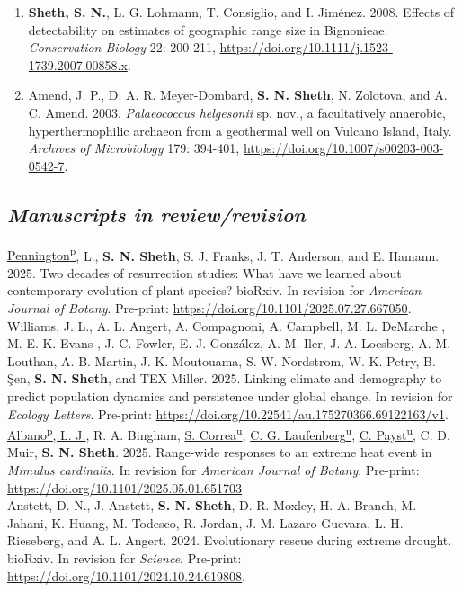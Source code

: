 \documentclass[11pt,english]{article}
\providecommand{\tabularnewline}{\\}
\begin{document}
\begin{hangparas}{.5in}{1}
\begin{enumerate}
\item \textbf{Sheth, S. N.}, L. G. Lohmann, T. Consiglio, and I. Jim\'enez. 2008. Effects of detectability on estimates of geographic range size in Bignonieae. \emph{Conservation Biology} 22: 200-211, \url{https://doi.org/10.1111/j.1523-1739.2007.00858.x}. 

\item Amend, J. P., D. A. R. Meyer-Dombard, \textbf{S. N. Sheth}, N. Zolotova, and A. C. Amend. 2003. \textit{Palaeococcus helgesonii} sp. nov., a facultatively anaerobic, hyperthermophilic archaeon from a geothermal well on Vulcano Island, Italy. \emph{Archives of Microbiology} 179: 394-401, \url{https://doi.org/10.1007/s00203-003-0542-7}. 

\end{enumerate}
\end{hangparas}

\subsection*{\textit{Manuscripts in review/revision}} 

\begin{hangparas}{.5in}{1}

\underline{Pennington\textsuperscript{p}}, L., \textbf{S. N. Sheth}, S. J. Franks, J. T. Anderson, and E. Hamann. 2025. Two decades of resurrection studies: What have we learned about contemporary evolution of plant species? bioRxiv. In revision for \emph{American Journal of Botany}. Pre-print: \url{https://doi.org/10.1101/2025.07.27.667050}. \tabularnewline

Williams, J. L., A. L. Angert, A. Compagnoni, A. Campbell, M. L. DeMarche , M. E. K. Evans , J. C. Fowler, E. J. González, A. M. Iler, J. A. Loesberg, A. M. Louthan, A. B. Martin, J. K. Moutouama, S. W. Nordstrom, W. K. Petry, B. Şen, \textbf{S. N. Sheth}, and TEX Miller. 2025. Linking climate and demography to predict population dynamics and persistence under global change. In revision for \emph{Ecology Letters}. Pre-print: \url{https://doi.org/10.22541/au.175270366.69122163/v1}. \tabularnewline

\underline{Albano\textsuperscript{p}, L. J.}, R. A. Bingham, \underline{S. Correa\textsuperscript{u}}, \underline{C. G. Laufenberg\textsuperscript{u}}, \underline{C. Payst\textsuperscript{u}}, C. D. Muir, \textbf{S. N. Sheth}. 2025. Range-wide responses to an extreme heat event in \emph{Mimulus cardinalis}. In revision for \emph{American Journal of Botany}. Pre-print: \url{https://doi.org/10.1101/2025.05.01.651703} \tabularnewline

Anstett, D. N., J. Anstett, \textbf{S. N. Sheth}, D. R. Moxley, H. A. Branch, M. Jahani, K. Huang, M. Todesco, R. Jordan, J. M. Lazaro-Guevara, L. H. Rieseberg, and A. L. Angert. 2024. Evolutionary rescue during extreme drought. bioRxiv. In revision for \emph{Science}. Pre-print: \url{https://doi.org/10.1101/2024.10.24.619808}. \tabularnewline

\end{hangparas}
\end{document}
